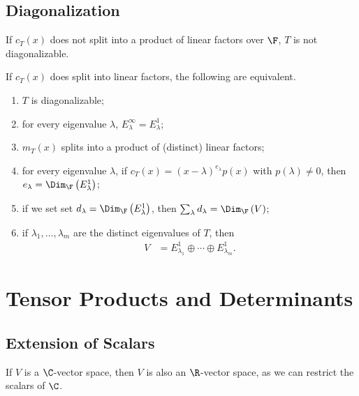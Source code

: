 \documentclass[10pt]{mypackage}
\begin{document}
\subsection{Diagonalization}%
\begin{theorem}
  If $c_T(x)$ does not split into a product of linear factors over $\F$, $T$ is not diagonalizable.\newline

  If $c_T(x)$ does split into linear factors, the following are equivalent.
  \begin{enumerate}[(1)]
    \item $T$ is diagonalizable;
    \item for every eigenvalue $\lambda$, $E_{\lambda}^{\infty} = E_{\lambda}^{1}$;
    \item $m_{T}(x)$ splits into a product of (distinct) linear factors;
    \item for every eigenvalue $\lambda$, if $c_T(x) = \left(x-\lambda\right)^{e_{\lambda}}p(x)$ with $p\left(\lambda\right)\neq 0$, then $e_{\lambda} = \Dim_{\F}\left(E_{\lambda}^{1}\right)$;
    \item if we set set $d_{\lambda} = \Dim_{\F}\left(E_{\lambda}^{1}\right)$, then $\sum_{\lambda} d_{\lambda} = \Dim_{\F}\left(V\right)$;
    \item if $\lambda_1,\dots,\lambda_m$ are the distinct eigenvalues of $T$, then
      \begin{align*}
        V &= E_{\lambda_1}^{1}\oplus\cdots\oplus E_{\lambda_m}^{1}.
      \end{align*}
  \end{enumerate}
\end{theorem}
\section{Tensor Products and Determinants}%
\subsection{Extension of Scalars}%
If $V$ is a $\C$-vector space, then $V$ is also an $\R$-vector space, as we can restrict the scalars of $\C$.\newline
\end{document}
